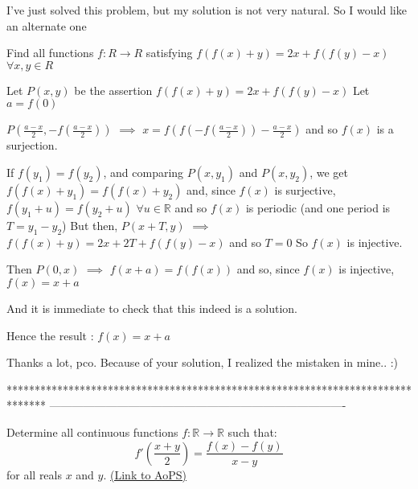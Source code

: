 \begin{solution}
	\begin{tcolorbox}I've just solved this problem, but my solution is not very natural. So I would like an alternate one

\begin{italicized}Find all functions $ f: R \rightarrow R$ satisfying
$ f(f(x) + y) = 2x + f(f(y) - x)$     $ \forall x,y \in R$\end{italicized}\end{tcolorbox}

Let $ P(x,y)$ be the assertion $ f(f(x)+y)=2x+f(f(y)-x)$
Let $ a=f(0)$

$ P(\frac {a-x}2,-f(\frac {a-x}2))$ $ \implies$ $ x=f(f(-f(\frac {a-x}2))-\frac {a-x}2)$ and so $ f(x)$ is a surjection.

If $ f(y_1)=f(y_2)$, and comparing $ P(x,y_1)$ and $ P(x,y_2)$, we get $ f(f(x)+y_1)=f(f(x)+y_2)$ and, since $ f(x)$ is surjective, $ f(y_1+u)=f(y_2+u)$ $ \forall u\in\mathbb R$ and so $ f(x)$ is periodic (and one period is $ T=y_1-y_2$)
But then, $ P(x+T,y)$ $ \implies$ $ f(f(x)+y)=2x+2T+f(f(y)-x)$ and so $ T=0$
So $ f(x)$ is injective.

Then $ P(0,x)$ $ \implies$ $ f(x+a)=f(f(x))$ and so, since $ f(x)$ is injective, $ f(x)=x+a$

And it is immediate to check that this indeed is a solution.

Hence the result : $ \boxed{f(x)=x+a}$
\end{solution}



\begin{solution}
	Thanks a lot, pco. Because of your solution, I realized the mistaken in mine.\/.  :)
\end{solution}
*******************************************************************************
-------------------------------------------------------------------------------

\begin{problem}
	Determine all continuous functions $ f: \mathbb {R}\to\mathbb {R}$ such that: 
\[ f'\left(\frac {x+y}{2}\right) =\frac {f(x)-f(y)}{x-y}\]
for all reals $x$ and $y$.
	\flushright \href{https://artofproblemsolving.com/community/c6h303362}{(Link to AoPS)}
\end{problem}



